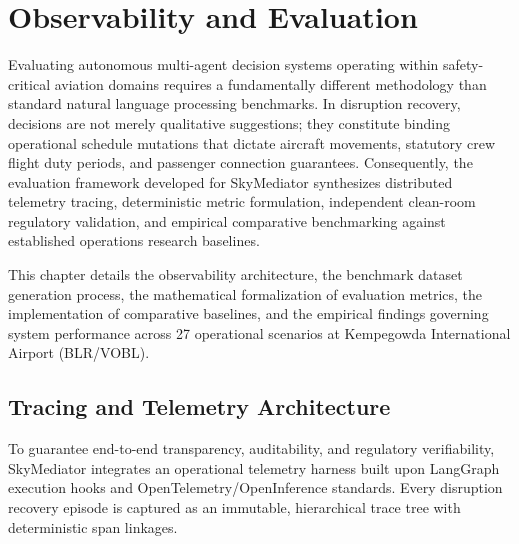 \chapter{Observability and Evaluation}
\label{chap:observability_evaluation}

Evaluating autonomous multi-agent decision systems operating within safety-critical aviation domains requires a fundamentally different methodology than standard natural language processing benchmarks. In disruption recovery, decisions are not merely qualitative suggestions; they constitute binding operational schedule mutations that dictate aircraft movements, statutory crew flight duty periods, and passenger connection guarantees. Consequently, the evaluation framework developed for SkyMediator synthesizes distributed telemetry tracing, deterministic metric formulation, independent clean-room regulatory validation, and empirical comparative benchmarking against established operations research baselines.

This chapter details the observability architecture, the benchmark dataset generation process, the mathematical formalization of evaluation metrics, the implementation of comparative baselines, and the empirical findings governing system performance across 27 operational scenarios at Kempegowda International Airport (BLR/VOBL).

\section{Tracing and Telemetry Architecture}
\label{sec:tracing_telemetry}

To guarantee end-to-end transparency, auditability, and regulatory verifiability, SkyMediator integrates an operational telemetry harness built upon LangGraph execution hooks and OpenTelemetry/OpenInference standards. Every disruption recovery episode is captured as an immutable, hierarchical trace tree with deterministic span linkages.

